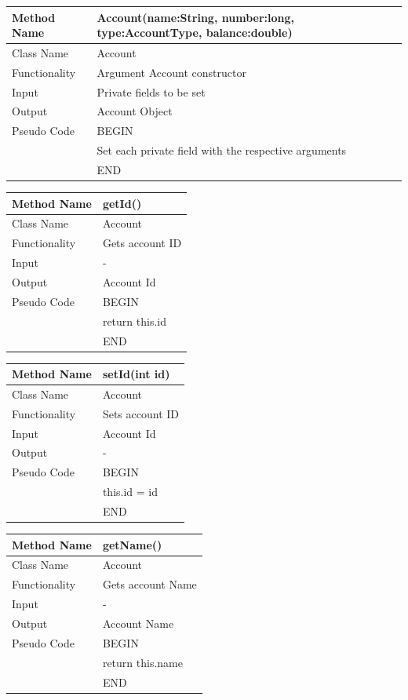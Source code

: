 \documentclass[12pt]{article}
\begin{document}
\begin{tabular}{ |p{3cm}||p{\colWidth}|  }
	\hline
	Method Name &  Account(name:String, number:long, type:AccountType, balance:double)\\
	\hline
	Class Name & Account\\
	\hline
	Functionality & Argument Account constructor\\
	\hline
	Input & Private fields to be set\\
	\hline
	Output & Account Object\\
	\hline
	Pseudo Code&BEGIN\\ & Set each private field with the respective arguments\\&END\\
	\hline
\end{tabular}  

\begin{tabular}{ |p{3cm}||p{\colWidth}|  }
	\hline
	Method Name &  getId()\\
	\hline
	Class Name & Account\\
	\hline
	Functionality & Gets account ID\\
	\hline
	Input & -\\
	\hline
	Output & Account Id\\
	\hline
	Pseudo Code&BEGIN\\ & return this.id\\&END\\
	\hline
\end{tabular}  

\begin{tabular}{ |p{3cm}||p{\colWidth}|  }
	\hline
	Method Name &  setId(int id)\\
	\hline
	Class Name & Account\\
	\hline
	Functionality & Sets account ID\\
	\hline
	Input & Account Id \\
	\hline
	Output & -\\
	\hline
	Pseudo Code&BEGIN\\ & this.id = id\\&END\\
	\hline
\end{tabular} 

\begin{tabular}{ |p{3cm}||p{\colWidth}|  }
	\hline
	Method Name &  getName()\\
	\hline
	Class Name & Account\\
	\hline
	Functionality & Gets account Name\\
	\hline
	Input & -\\
	\hline
	Output & Account Name\\
	\hline
	Pseudo Code&BEGIN\\ & return this.name\\&END\\
	\hline
\end{tabular}  
\end{document}
